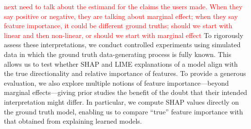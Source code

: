\documentclass[mnsc,blindrev]{informs3}
\begin{document}
 

 









\textcolor{red}{next need to talk about the estimand for the claims the users made. When they say positive or negative, they are talking about marginal effect; when they say feature importance, it could be different ground truths; should we start with linear and then non-linear, or should we start with marginal effect}
To rigorously assess these interpretations, we conduct controlled experiments using simulated data in which the ground truth data-generating process is fully known. This allows us to test whether SHAP and LIME explanations of a model align with the true directionality and relative importance of features. To provide a generous evaluation, we also explore multiple notions of feature importance—beyond marginal effects—giving prior studies the benefit of the doubt that their intended interpretation might differ. In particular, we compute SHAP values directly on the ground truth model, enabling us to compare “true” feature importance with that obtained from explaining learned models.
\end{document}
